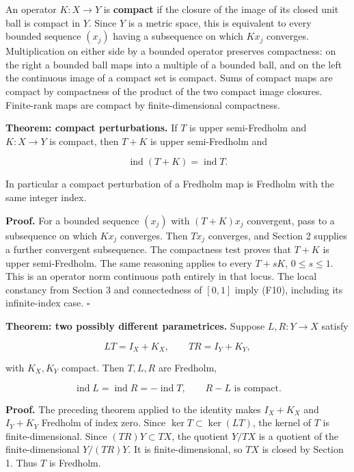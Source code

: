 \documentclass[
  11pt,
]{article}
\begin{document}
An operator \(K:X\to Y\) is \textbf{compact} if the closure of the image
of its closed unit ball is compact in \(Y\). Since \(Y\) is a metric
space, this is equivalent to every bounded sequence \((x_j)\) having a
subsequence on which \(Kx_j\) converges. Multiplication on either side
by a bounded operator preserves compactness: on the right a bounded ball
maps into a multiple of a bounded ball, and on the left the continuous
image of a compact set is compact. Sums of compact maps are compact by
compactness of the product of the two compact image closures.
Finite-rank maps are compact by finite-dimensional compactness.

\textbf{Theorem: compact perturbations.} If \(T\) is upper semi-Fredholm
and \(K:X\to Y\) is compact, then \(T+K\) is upper semi-Fredholm and

\[
\operatorname{ind}(T+K)=\operatorname{ind}T.                    \tag{F10}
\]

In particular a compact perturbation of a Fredholm map is Fredholm with
the same integer index.

\textbf{Proof.} For a bounded sequence \((x_j)\) with \((T+K)x_j\)
convergent, pass to a subsequence on which \(Kx_j\) converges. Then
\(Tx_j\) converges, and Section 2 supplies a further convergent
subsequence. The compactness test proves that \(T+K\) is upper
semi-Fredholm. The same reasoning applies to every \(T+sK\),
\(0\leq s\leq1\). This is an operator norm continuous path entirely in
that locus. The local constancy from Section 3 and connectedness of
\([0,1]\) imply (F10), including its infinite-index case. \(\square\)

\textbf{Theorem: two possibly different parametrices.} Suppose
\(L,R:Y\to X\) satisfy

\[
LT=I_X+K_X,\qquad TR=I_Y+K_Y,                                 \tag{F11}
\]

with \(K_X,K_Y\) compact. Then \(T,L,R\) are Fredholm,

\[
\operatorname{ind}L=\operatorname{ind}R=-\operatorname{ind}T,
\qquad R-L\text{ is compact}.                                 \tag{F12}
\]

\textbf{Proof.} The preceding theorem applied to the identity makes
\(I_X+K_X\) and \(I_Y+K_Y\) Fredholm of index zero. Since
\(\ker T\subset\ker(LT)\), the kernel of \(T\) is finite-dimensional.
Since \((TR)Y\subset TX\), the quotient \(Y/TX\) is a quotient of the
finite-dimensional \(Y/(TR)Y\). It is finite-dimensional, so \(TX\) is
closed by Section 1. Thus \(T\) is Fredholm.
\end{document}
